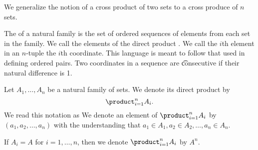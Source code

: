 

We generalize the notion of a cross product of two sets to a cross produce of $n$ sets.


The  of a natural family is the set of ordered sequences of elements from each set in the family.
We call the elements of the direct product .
We call the $i$th element in an $n$-tuple the $i$th coordinate.
This language is meant to follow that used in defining ordered pairs.
Two coordinates in a sequence are \t{consecutive} if their natural difference is 1.


Let $A_1, \dots, A_n$ be a natural family
of sets. We denote its direct product by
\[
  \product_{i = 1}^{n} A_{i}.
\]
We read this notation as 
We denote an element of $\product_{i = 1}^{n} A_{i}$ by $(a_1, a_2, \dots, a_n)$ with the understanding that $a_1 \in A_1, a_2 \in A_2, \dots, a_n \in A_n$.

If $A_i = A$ for $i = 1, \dots, n$, then we denote
$\product_{i = 1}^{n} A_{i}$ by $A^n$.


\strats
